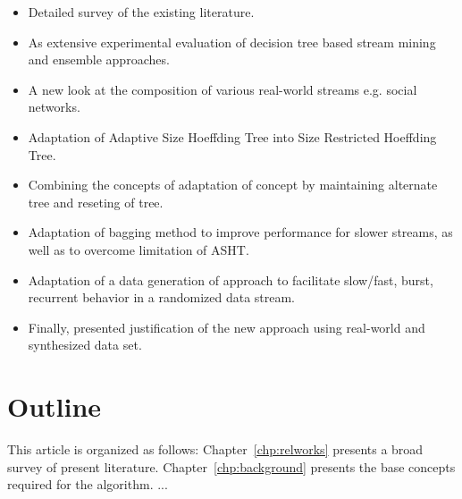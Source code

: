 \begin{itemize}
    \item Detailed survey of the existing literature.
    \item As extensive experimental evaluation of decision tree based stream mining and ensemble approaches.
    \item A new look at the composition of various real-world streams e.g. social networks.
    \item Adaptation of Adaptive Size Hoeffding Tree into Size Restricted Hoeffding Tree.
    \item Combining the concepts of adaptation of concept by maintaining alternate tree and reseting of tree.
    \item Adaptation of bagging method to improve performance for slower streams, as well as to overcome limitation of ASHT.
    \item Adaptation of a data generation of approach to facilitate slow/fast, burst, recurrent behavior in a randomized data stream.
    \item Finally, presented justification of the new approach using real-world and synthesized data set.
\end{itemize}


\section{Outline}
This article is organized as follows: Chapter~\ref{chp:relworks} presents a broad survey of present literature. Chapter~\ref{chp:background} presents the base concepts required for the algorithm. ...
